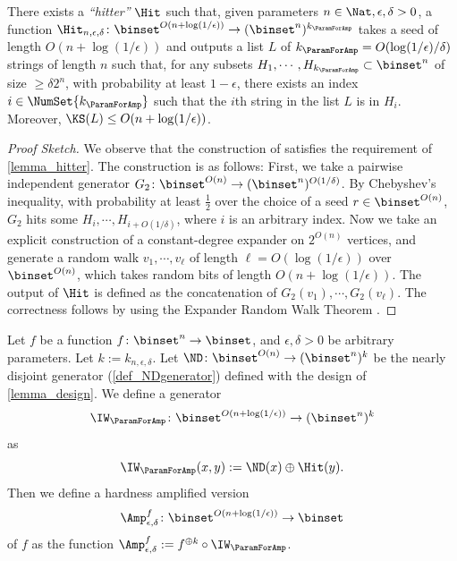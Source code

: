 \documentclass{toc}
\begin{document}
\begin{lemma}
  \label{lemma_hitter}
  There exists a \emph{``hitter''} $\Hit$ such that, given parameters $n \in \Nat, \epsilon, \delta > 0$,
  a function $\Hit_{n, \epsilon, \delta} \colon \binset^{O(n + \log( 1 / \epsilon) )} \to (\binset^n)^{k_\ParamForAmp}$ takes a seed of length $O(n + \log ( 1 / \epsilon ))$
  and outputs
  a list $L$ of
  $k_\ParamForAmp = O(\log(1 / \epsilon) / \delta)$ strings of length $n$
  such that,
  for any subsets $H_1, \cdots, H_{k_\ParamForAmp} \subset \binset^n$ of size $\ge \delta 2^n$,
  with probability at least $1 - \epsilon$,
  there exists an index $i \in \NumSet{k_\ParamForAmp}$ such that the $i$th string in the list $L$ is in $H_i$.
  Moreover, $\KS(L) \le O(n + \log ( 1 / \epsilon ))$.
\end{lemma}

\begin{proof}
  [Proof Sketch]
  We observe that the construction of \cite[Appendix C]{Goldreich11j_goldreich2011_sp_books} satisfies the requirement of \cref{lemma_hitter}.
  The construction is as follows:
  First, we take a pairwise independent generator $G_2 \colon \binset^{O(n)} \to (\binset^n)^{O(1 / \delta)}$.
  By Chebyshev's inequality, with probability at least $\frac{1}{2}$ over the choice of a seed $r \in \binset^{O(n)}$,
  $G_2$ hits some $H_i, \cdots, H_{i + O(1 / \delta)}$, where $i$ is an arbitrary index.
  Now we take an explicit construction of a constant-degree expander on $2^{O(n)}$ vertices,
  and generate a random walk $v_1, \cdots, v_\ell$ of length $\ell = O(\log (1 / \epsilon))$ over $\binset^{O(n)}$,
  which takes random bits of length $O(n + \log (1 / \epsilon))$.
  The output of $\Hit$ is defined as the concatenation of $G_2(v_1), \cdots, G_2(v_\ell)$.
  The correctness follows by using the Expander Random Walk Theorem \cite[Theorem A.4]{Goldreich11j_goldreich2011_sp_books}.
\end{proof}

%
%

\begin{definition}
  Let $f$ be a function $f \colon \binset^n \to \binset$, and $\epsilon, \delta > 0$ be arbitrary parameters.
  Let $k := k_{n, \epsilon, \delta}$.
  Let $\ND \colon \binset^{O(n)} \to (\binset^n)^{k}$ be the nearly disjoint generator (\cref{def_NDgenerator}) defined with the design of \cref{lemma_design}.
  We define a generator $$\IW_\ParamForAmp \colon \binset^{O(n + \log(1 / \epsilon))} \to (\binset^n)^{k}$$ as $$\IW_\ParamForAmp(x, y) := \ND(x) \oplus \Hit(y).$$
  Then we
  define a hardness amplified version $$\Amp_{\epsilon, \delta}^f \colon \binset^{O(n + \log(1 / \epsilon))} \to \binset$$ of $f$
  as
  the function $\Amp_{\epsilon, \delta}^f := f^{\oplus k} \circ \IW_\ParamForAmp$.
\end{definition}
\end{document}
